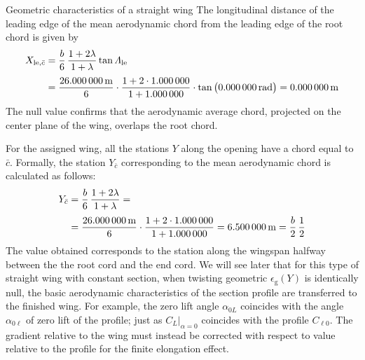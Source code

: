 \documentclass[[12pt,twoside]{book}
\begin{document}
\begin{myExampleX}{Geometric characteristics of a straight wing}{}
\noindent
The longitudinal distance of the leading edge of the mean aerodynamic chord from the
leading edge of the root chord is given by
\[
\begin{split}
X_{\mathrm{le},\bar{c}} 
  & {}=
    \frac{b}{6} \, \frac{1+2\lambda}{1+\lambda} \tan\Lambda_\mathrm{le} \\[3pt]
  & {}=
    \frac{\SI[round-precision=1]{\mySpanWingMT}{\metre}}{6}
      \cdot 
      \frac{
        1 + 2\cdot\SI[round-precision=0]{\myTaperRatioWing}{}
      }{
        1 + \SI[round-precision=0]{\myTaperRatioWing}{}
      }
      \cdot \tan \big( \SI[round-precision=0]{\myLambdaLERad}{\radian} \big)
    = { \SI[round-precision=0]{\myXLEMACWingMT}{\metre} }%
\end{split}
\]
The null value confirms that the aerodynamic average chord, projected on the center plane
of the wing, overlaps the root chord.

\noindent
For the assigned wing, all the stations $ Y $ along the opening have a chord equal to $ \bar{c} $.
Formally, the station $ Y _ {\bar{c}} $ corresponding to the mean aerodynamic chord
is calculated as follows:
\[
\begin{split}
Y_{\bar{c}} 
  & {}=
    \frac{b}{6} \, \frac{1+2\lambda}{1+\lambda} = \\[3pt]
  & {}=
    \frac{\SI[round-precision=1]{\mySpanWingMT}{\metre}}{6}
      \cdot 
      \frac{
        1 + 2\cdot\SI[round-precision=2]{\myTaperRatioWing}{}
      }{
        1 + \SI[round-precision=2]{\myTaperRatioWing}{}
      }
    = { \SI[round-precision=2]{\myYMACWingMT}{\metre} }
    = \frac{b}{2} \, \frac{1}{2}
\end{split}
\]
The value obtained corresponds to the station along the wingspan halfway between the
the root cord and the end cord.
We will see later that for this type of straight wing with constant section, when twisting
geometric $ \epsilon_\mathrm {g} (Y) $ is identically null,
the basic aerodynamic characteristics of the section profile are transferred to the finished wing.
For example, the zero lift angle $\alpha_ {0L} $ coincides with the angle $ \alpha_ {0 \ell} $
of zero lift of the profile; just as $C_L \big|_{\alpha = 0} $ coincides with the profile $ C _ {\ell 0} $.
The gradient  relative to the wing must instead be corrected with respect to
 value relative to the profile for the finite elongation effect.

\end{myExampleX}
\end{document}
